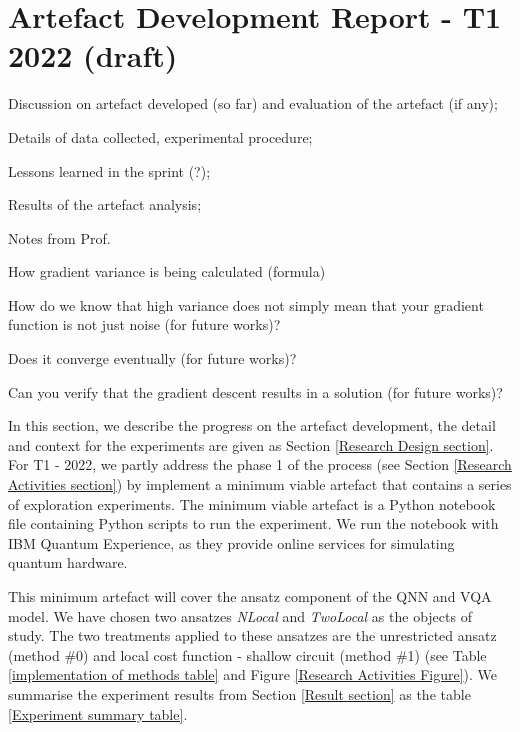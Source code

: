 \section{Artefact Development Report - T1 2022 (draft)}
\begin{todolist}
    \item[\done] Discussion on artefact developed (so far) and evaluation of the artefact (if any);
    \item[\done] Details of data collected, experimental procedure;
    \item Lessons learned in the sprint (?);
    \item[\done] Results of the artefact analysis;
\end{todolist}

Notes from Prof.

\begin{todolist}
    \item[\done] How gradient variance is being calculated (formula)
    \item[\done] How do we know that high variance does not simply mean that your gradient function is not just noise (for future works)?
    \item Does it converge eventually (for future works)?
    \item Can you verify that the gradient descent results in a solution (for future works)?
\end{todolist}

In this section, we describe the progress on the artefact development, the detail and context for the experiments are given as Section \ref{Research Design section}.
For T1 - 2022, we partly address the phase 1 of the process (see Section \ref{Research Activities section}) by implement a minimum viable artefact that contains a series of exploration experiments.
The minimum viable artefact is a Python notebook file containing Python scripts to run the experiment.
We run the notebook with IBM Quantum Experience, as they provide online services for simulating quantum hardware.

This minimum artefact will cover the ansatz component of the QNN and VQA model.
We have chosen two ansatzes \emph{NLocal} and \emph{TwoLocal} as the objects of study.
The two treatments applied to these ansatzes are the unrestricted ansatz (method \#0) and local cost function - shallow circuit (method \#1) (see Table \ref{implementation of methods table} and Figure \ref{Research Activities Figure}).
We summarise the experiment results from Section \ref{Result section} as the table \ref{Experiment summary table}.

